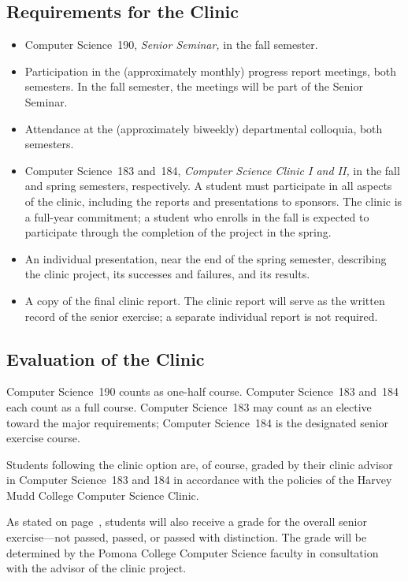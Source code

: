 \documentclass[finalcopy]{srpaper}
\def\hyperref[#1]{}
\let\plainpageref\pageref
\newcommand{\plainpageref}{\pageref*}
\newcommand{\namedpageref}[2]{\hyperref[#2]{#1~\plainpageref{#2}}}
\begin{document}
\subsection*{Requirements for the Clinic}
\begin{itemize}
\item
Computer Science~190, \textit{Senior Seminar,} in the fall
semester.
\item
Participation in the (approximately monthly) progress report
meetings, both semesters. In the fall semester, the meetings
will be part of the Senior Seminar.
\item
Attendance at the (approximately biweekly) departmental
colloquia, both semesters.
\item
Computer Science~183 and~184, \textit{Computer Science
Clinic I and II,} in the fall and spring semesters,
respectively. A student must participate in all aspects of
the clinic, including the reports and presentations to
sponsors. The clinic is a full-year commitment; a student
who enrolls in the fall is expected to participate through
the completion of the project in the spring.
\item
An individual presentation, near the end of the spring
semester, describing the clinic project, its successes and
failures, and its results.
\item
A copy of the final clinic report. The clinic report
will serve as the written record of the senior exercise; a
separate individual report is not required.
\end{itemize}

\subsection*{Evaluation of the Clinic}
Computer Science~190 counts as one-half course. Computer
Science~183 and~184 each count as a full course.
Computer Science~183 may count as an elective
toward the major requirements; Computer Science~184 is the
designated senior exercise course.

Students following the clinic option are, of course, graded
by their clinic advisor in Computer Science~183 and 184 in
accordance with the policies of the Harvey Mudd College
Computer Science Clinic.

As stated on \namedpageref{page}{Page:SeniorExerciseGrading},
students will also receive a grade for the overall senior
exercise---not passed, passed, or passed with
distinction. The grade will be determined by the Pomona
College Computer Science faculty in consultation with the
advisor of the clinic project.
\end{document}
